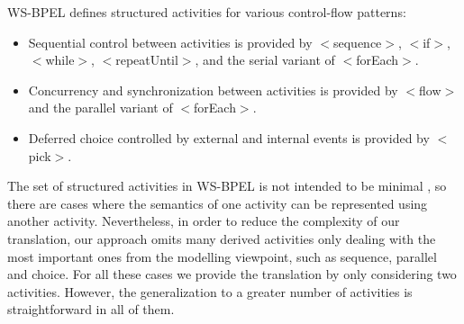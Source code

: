 WS-BPEL defines structured activities for various control-flow patterns:
\begin{itemize} 
\item Sequential control between activities is provided by $<$sequence$>$, $<$if$>$, \linebreak $<$while$>$, 
$<$repeatUntil$>$, and the serial variant of $<$forEach$>$. 
\item Concurrency and synchronization between activities is provided by $<$flow$>$ and the 
parallel variant of $<$forEach$>$.  
\item Deferred choice controlled by external and internal events is provided by $<$pick$>$.  
\end{itemize}
The set of structured activities in WS-BPEL is not intended to be minimal \cite{Andrews2003WSBPEL}, so there are cases where 
the semantics of one activity can be represented using another activity. Nevertheless, in order to reduce the complexity
of our translation, our approach omits many derived activities only dealing with the most important ones from the modelling viewpoint,
such as sequence, parallel and choice. For all these cases we provide the translation
by only considering two activities. However, the generalization
to a greater number of activities is straightforward in all
of them. 
